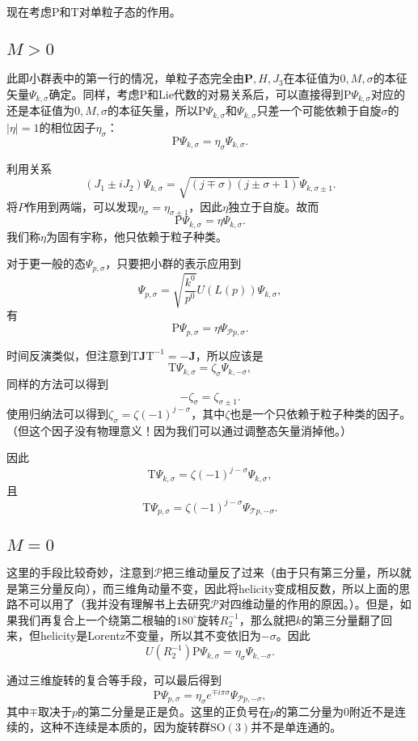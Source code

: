 现在考虑$\mathrm{P}$和$\mathrm{T}$对单粒子态的作用。

\subsection*{$M>0$}
此即小群表中的第一行的情况，单粒子态完全由$\bm{P},H,J_3$在本征值为$0,M,\sigma$的本征矢量$\Psi_{k,\sigma}$确定。同样，考虑$\mathrm{P}$和Lie代数的对易关系后，可以直接得到$\mathrm{P}\Psi_{k,\sigma}$对应的还是本征值为$0,M,\sigma$的本征矢量，所以$\mathrm{P}\Psi_{k,\sigma}$和$\Psi_{k,\sigma}$只差一个可能依赖于自旋$\sigma$的$|\eta|=1$的相位因子$\eta_{\sigma}$：
\[
\mathrm{P}\Psi_{k,\sigma}=\eta_{\sigma}\Psi_{k,\sigma}.
\]

利用关系
\[
(J_1\pm iJ_2)\Psi_{k,\sigma}=\sqrt{(j\mp \sigma)(j\pm \sigma+1)}\Psi_{k,\sigma\pm 1}.
\]
将$P$作用到两端，可以发现$\eta_{\sigma}=\eta_{\sigma\pm 1}$，因此$\eta$独立于自旋。故而
\[
\mathrm{P}\Psi_{k,\sigma}=\eta\Psi_{k,\sigma}.
\]
我们称$\eta$为固有宇称，他只依赖于粒子种类。

对于更一般的态$\Psi_{p,\sigma}$，只要把小群的表示应用到
\[
\Psi_{p,\sigma}=\sqrt{\frac{k^0}{p^0}}U(L(p))\Psi_{k,\sigma},
\]
有
\[
\mathrm{P}\Psi_{p,\sigma}=\eta\Psi_{\mathscr{P}p,\sigma}.
\]

时间反演类似，但注意到$\mathrm{T}\bm{J}\mathrm{T}^{-1}=-\bm{J}$，所以应该是
\[
\mathrm{T}\Psi_{k,\sigma}=\zeta_{\sigma}\Psi_{k,-\sigma},
\]
同样的方法可以得到
\[
-\zeta_{\sigma}=\zeta_{\sigma\pm 1}.
\]
使用归纳法可以得到$\zeta_{\sigma}=\zeta(-1)^{j-\sigma}$，其中$\zeta$也是一个只依赖于粒子种类的因子。（但这个因子没有物理意义！因为我们可以通过调整态矢量消掉他。）

因此
\[
\mathrm{T}\Psi_{k,\sigma}=\zeta(-1)^{j-\sigma}\Psi_{k,\sigma},
\]
且
\[
\mathrm{T}\Psi_{p,\sigma}=\zeta(-1)^{j-\sigma}\Psi_{\mathscr{T}p,-\sigma}.
\]

\subsection*{$M=0$}
这里的手段比较奇妙，注意到$\mathscr{P}$把三维动量反了过来（由于只有第三分量，所以就是第三分量反向），而三维角动量不变，因此将helicity变成相反数，所以上面的思路不可以用了（我并没有理解书上去研究$\mathscr{P}$对四维动量的作用的原因。）。但是，如果我们再复合上一个绕第二根轴的$180^\circ$旋转$R_2^{-1}$，那么就把$k$的第三分量翻了回来，但helicity是Lorentz不变量，所以其不变依旧为$-\sigma$。因此
\[
U(R_2^{-1})\mathrm{P}\Psi_{k,\sigma}=\eta_{\sigma}\Psi_{k,-\sigma}.
\]

通过三维旋转的复合等手段，可以最后得到
\[
\mathrm{P}\Psi_{p,\sigma}=\eta_{\sigma}e^{\mp i\pi\sigma}\Psi_{\mathscr{P}p,-\sigma},
\]
其中$\mp$取决于$p$的第二分量是正是负。这里的正负号在$p$的第二分量为0附近不是连续的，这种不连续是本质的，因为旋转群$\mathrm{SO}(3)$并不是单连通的。

